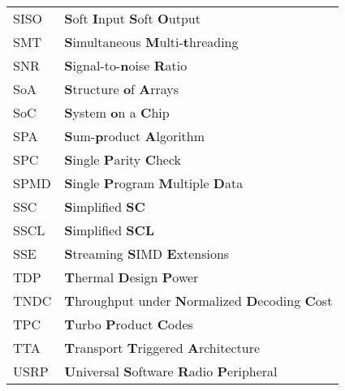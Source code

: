 \begin{center}
\begin{longtable}{ p{}  p{} }
		SISO    & \textbf{S}oft \textbf{I}nput \textbf{S}oft \textbf{O}utput                                                      \\
		SMT     & \textbf{S}imultaneous \textbf{M}ulti-\textbf{t}hreading                                                         \\
		SNR     & \textbf{S}ignal-to-\textbf{n}oise \textbf{R}atio                                                                \\
		SoA     & \textbf{S}tructure \textbf{o}f \textbf{A}rrays                                                                  \\
		SoC     & \textbf{S}ystem \textbf{o}n a \textbf{C}hip                                                                     \\
		SPA     & \textbf{S}um-\textbf{p}roduct \textbf{A}lgorithm                                                                \\
		SPC     & \textbf{S}ingle \textbf{P}arity \textbf{C}heck                                                                  \\
		SPMD    & \textbf{S}ingle \textbf{P}rogram \textbf{M}ultiple \textbf{D}ata                                                \\
		SSC     & \textbf{S}implified \textbf{SC}                                                                                 \\
		SSCL    & \textbf{S}implified \textbf{SCL}                                                                                \\
		SSE     & \textbf{S}treaming \textbf{S}IMD \textbf{E}xtensions                                                            \\
		TDP     & \textbf{T}hermal \textbf{D}esign \textbf{P}ower                                                                 \\
		TNDC    & \textbf{T}hroughput under \textbf{N}ormalized \textbf{D}ecoding \textbf{C}ost                                   \\
		TPC     & \textbf{T}urbo \textbf{P}roduct \textbf{C}odes                                                                  \\
		TTA     & \textbf{T}ransport \textbf{T}riggered \textbf{A}rchitecture                                                     \\
		USRP    & \textbf{U}niversal \textbf{S}oftware \textbf{R}adio \textbf{P}eripheral                                         \\

\end{longtable}
\end{center}
